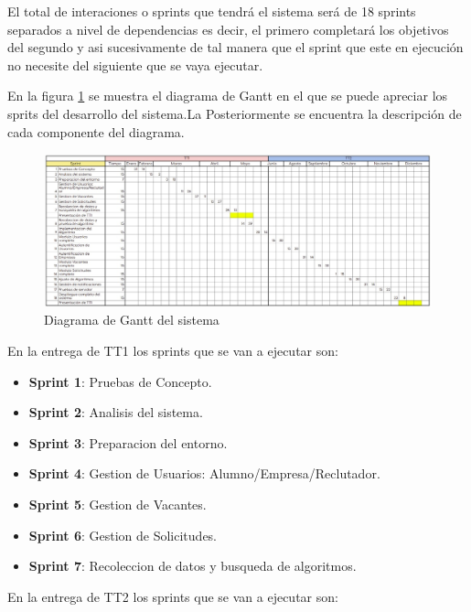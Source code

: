 El total de interaciones o sprints que tendrá el sistema será de 18 sprints separados a nivel de dependencias es decir, el primero
completará los objetivos del segundo y asi sucesivamente de tal manera que el sprint que este en ejecución 
no necesite del siguiente que se vaya ejecutar.
\newline

En la figura \ref{fig:cronograma} se muestra el diagrama de Gantt en el que se puede apreciar los sprits del desarrollo del sistema.La
Posteriormente se encuentra la descripción de cada componente del diagrama.

\begin{figure}[hbtp!]
    \begin{center}
        \includegraphics[width=1\textwidth]{propuesta/imagenes/gantt.jpeg}
    \end{center}
    \caption{Diagrama de Gantt del sistema}
    \label{fig:cronograma}
\end{figure}

En la entrega de TT1 los sprints que se van a ejecutar son:

\begin{itemize}
    \item \textbf{Sprint 1}: Pruebas de Concepto.
    \item \textbf{Sprint 2}: Analisis del sistema.
    \item \textbf{Sprint 3}: Preparacion del entorno.
    \item \textbf{Sprint 4}: Gestion de Usuarios: Alumno/Empresa/Reclutador.
    \item \textbf{Sprint 5}: Gestion de Vacantes.
    \item \textbf{Sprint 6}: Gestion de Solicitudes.
    \item \textbf{Sprint 7}: Recoleccion de datos y busqueda de algoritmos.
\end{itemize}


En la entrega de TT2 los sprints que se van a ejecutar son:

